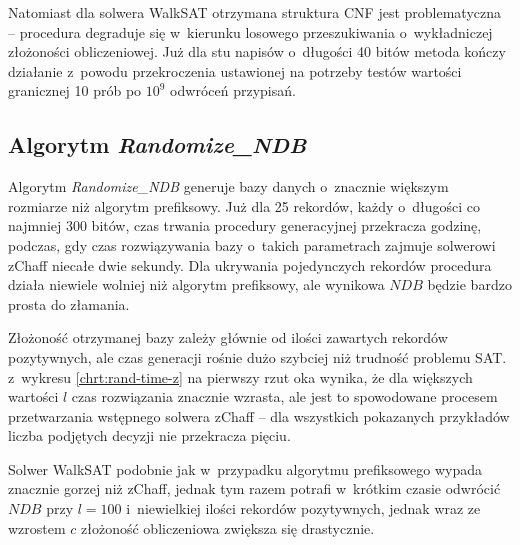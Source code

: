 Natomiast dla solwera WalkSAT otrzymana struktura CNF jest problematyczna -- procedura degraduje się w~kierunku losowego przeszukiwania o~wykładniczej złożoności obliczeniowej.
Już dla stu napisów o~długości 40 bitów metoda kończy działanie z~powodu przekroczenia ustawionej na potrzeby testów wartości granicznej 10 prób po $10^9$ odwróceń przypisań.


\subsection{Algorytm \textit{Randomize\_NDB}}

Algorytm \textit{Randomize\_NDB} generuje bazy danych o~znacznie większym rozmiarze niż algorytm prefiksowy. Już dla 25 rekordów, każdy o~długości co najmniej 300 bitów, czas trwania procedury generacyjnej przekracza godzinę,
podczas, gdy czas rozwiązywania bazy o~takich parametrach zajmuje solwerowi zChaff niecałe dwie sekundy. Dla ukrywania pojedynczych rekordów procedura działa niewiele wolniej niż algorytm prefiksowy, ale wynikowa $NDB$ będzie bardzo prosta do złamania.

Złożoność otrzymanej bazy zależy głównie od ilości zawartych rekordów pozytywnych, ale czas generacji rośnie dużo szybciej niż trudność problemu SAT. z~wykresu \ref{chrt:rand-time-z} na pierwszy rzut oka wynika, że dla większych wartości $l$ czas rozwiązania znacznie wzrasta, ale jest to spowodowane
procesem przetwarzania wstępnego solwera zChaff -- dla wszystkich pokazanych przykładów liczba podjętych decyzji nie przekracza pięciu.

Solwer WalkSAT podobnie jak w~przypadku algorytmu prefiksowego wypada znacznie gorzej niż zChaff, jednak tym razem potrafi w~krótkim czasie odwrócić $NDB$ przy $l=100$ i~niewielkiej ilości rekordów pozytywnych, jednak wraz ze wzrostem $c$ złożoność obliczeniowa zwiększa się drastycznie.

